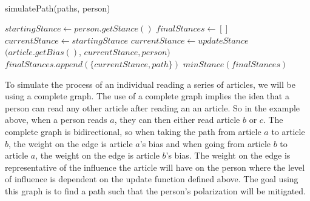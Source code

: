 \documentclass[11pt,reqno]{proc}
\begin{document}
\vspace{6mm}
 \\
\begin{center}
\end{center}

\begin{algorithm}
\caption{simulatePath(paths, person)}
\begin{algorithmic} 
\STATE $startingStance \leftarrow person.getStance()$
\STATE $finalStances \leftarrow [ ]$
\STATE $currentStance \leftarrow startingStance$
\STATE $currentStance \leftarrow updateStance$$(article.getBias()$, $currentStance, person)$
\ENDFOR
\STATE $finalStances.append(\{currentStance, path\})$
\ENDFOR
\RETURN $minStance(finalStances)$
\end{algorithmic}
\end{algorithm}

To simulate the process of an individual reading a series of articles, we will be using a complete graph. The use of a complete graph implies the idea that a person can read any other article after reading an an article. So in the example above, when a person reads $a$, they can then either read article $b$ or $c$. The complete graph is bidirectional, so when taking the path from article $a$ to article $b$, the weight on the edge is article $a$'s bias and when going from article $b$ to article $a$, the weight on the edge is article $b$'s bias. The weight on the edge is representative of the influence the article will have on the person where the level of influence is dependent on the update function defined above. The goal using this graph is to find a path such that the person's polarization will be mitigated. 
\end{document}
